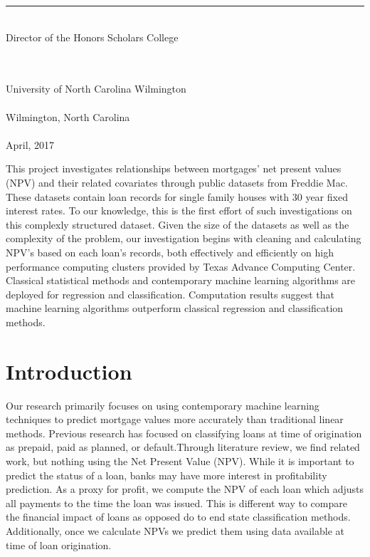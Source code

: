\documentclass[12 pt]{uncw_thesis}
\theoremstyle{plain}
\theoremstyle{remark}
\theoremstyle{definition}
\begin{document}
\begin{singlespace}
    \rule{7.5cm}{.01in}\\
     Director of the Honors Scholars College \\
\begin{center}   
    \hskip 1pt \\
    \hskip 1pt \\    %
    University of North Carolina Wilmington\\
    \hskip 1pt \\    %
    Wilmington, North Carolina \\
    \hskip 1pt \\    %
    April, 2017\\
\end{center}
\end{singlespace}
\newpage

%
%

\newpage
\pagestyle{plain}
\begin{center}
\tableofcontents
\end{center}


%
%

This project investigates relationships between mortgages' net present values (NPV) and their related covariates through public datasets from Freddie Mac. These datasets contain loan records for single family houses with 30 year fixed interest rates. To our knowledge, this is the first effort of such investigations on this complexly structured dataset. Given the size of the datasets as well as the complexity of the problem, our investigation begins with cleaning and calculating NPV’s based on each loan’s records, both effectively and efficiently on high performance computing clusters provided by Texas Advance Computing Center. Classical statistical methods and contemporary machine learning algorithms are deployed for regression and classification. Computation results suggest that machine learning algorithms outperform classical regression and classification methods.

\newpage
{}
\section{Introduction}
\thispagestyle{plain}
Our research primarily focuses on using contemporary machine learning techniques to  predict mortgage values more accurately than traditional linear methods. Previous research has focused on classifying loans at time of origination as prepaid, paid as planned, or default\cite{Deng}.Through literature review, we find related work, but nothing using the Net Present Value (NPV). While it is important to predict the status of a loan, banks may have more interest in profitability prediction. As a proxy for profit, we compute the NPV of each loan which adjusts all payments to the time the loan was issued. This is different way to compare the financial impact of loans as opposed do to end state classification methods. Additionally, once we calculate NPVs we predict them using data available at time of loan origination. 
\end{document}
